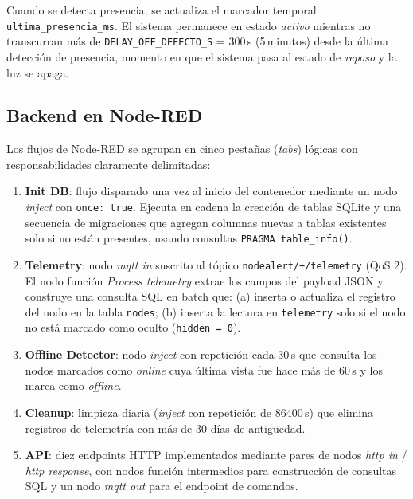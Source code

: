 Cuando se detecta presencia, se actualiza el marcador temporal
\texttt{ultima\_presencia\_ms}. El sistema permanece en estado \textit{activo}
mientras no transcurran más de \texttt{DELAY\_OFF\_DEFECTO\_S} = 300\,s (5\,minutos)
desde la última detección de presencia, momento en que el sistema pasa al estado
de \textit{reposo} y la luz se apaga.

\subsection{Backend en Node-RED}

Los flujos de Node-RED se agrupan en cinco pestañas (\textit{tabs}) lógicas con
responsabilidades claramente delimitadas:

\begin{enumerate}
  \item \textbf{Init DB}: flujo disparado una vez al inicio del contenedor mediante
        un nodo \textit{inject} con \texttt{once: true}. Ejecuta en cadena la
        creación de tablas SQLite y una secuencia de migraciones que agregan columnas
        nuevas a tablas existentes solo si no están presentes, usando consultas
        \texttt{PRAGMA table\_info()}.
  \item \textbf{Telemetry}: nodo \textit{mqtt in} suscrito al tópico
        \texttt{nodealert/+/telemetry} (QoS 2). El nodo función
        \textit{Process telemetry} extrae los campos del payload JSON y construye
        una consulta SQL en batch que: (a) inserta o actualiza el registro del nodo
        en la tabla \texttt{nodes}; (b) inserta la lectura en \texttt{telemetry}
        solo si el nodo no está marcado como oculto (\texttt{hidden = 0}).
  \item \textbf{Offline Detector}: nodo \textit{inject} con repetición cada 30\,s
        que consulta los nodos marcados como \textit{online} cuya última vista
        fue hace más de 60\,s y los marca como \textit{offline}.
  \item \textbf{Cleanup}: limpieza diaria (\textit{inject} con repetición de
        86400\,s) que elimina registros de telemetría con más de 30 días de
        antigüedad.
  \item \textbf{API}: diez endpoints HTTP implementados mediante pares de nodos
        \textit{http in} / \textit{http response}, con nodos función intermedios
        para construcción de consultas SQL y un nodo \textit{mqtt out} para el
        endpoint de comandos.
\end{enumerate}

